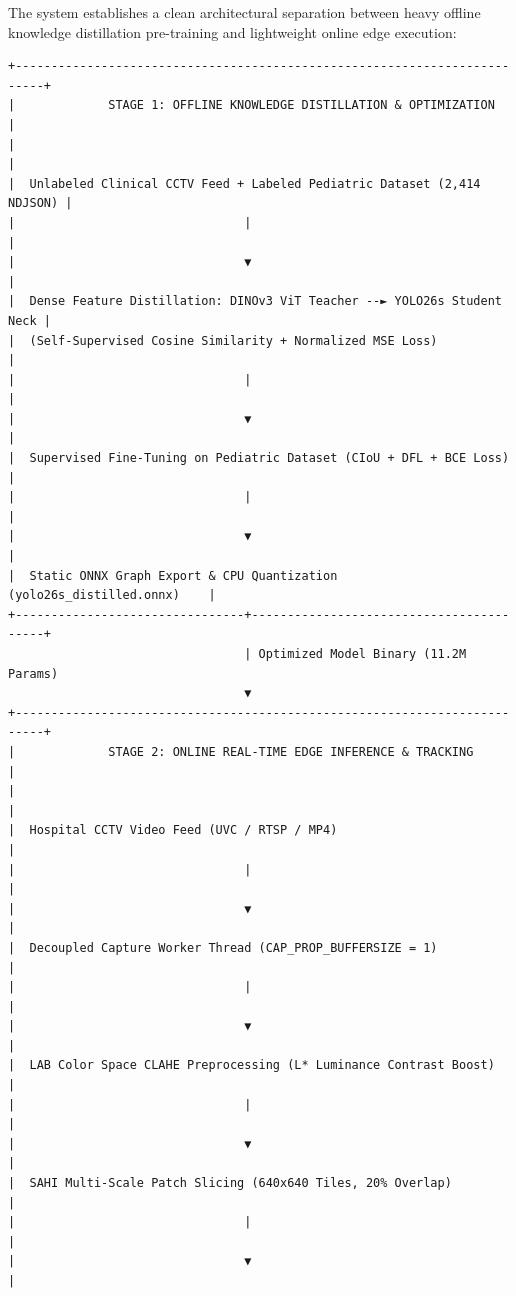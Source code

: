 The system establishes a clean architectural separation between heavy
offline knowledge distillation pre-training and lightweight online edge
execution:

\begin{verbatim}
+--------------------------------------------------------------------------+
|             STAGE 1: OFFLINE KNOWLEDGE DISTILLATION & OPTIMIZATION       |
|                                                                          |
|  Unlabeled Clinical CCTV Feed + Labeled Pediatric Dataset (2,414 NDJSON) |
|                                |                                         |
|                                ▼                                         |
|  Dense Feature Distillation: DINOv3 ViT Teacher --► YOLO26s Student Neck |
|  (Self-Supervised Cosine Similarity + Normalized MSE Loss)               |
|                                |                                         |
|                                ▼                                         |
|  Supervised Fine-Tuning on Pediatric Dataset (CIoU + DFL + BCE Loss)     |
|                                |                                         |
|                                ▼                                         |
|  Static ONNX Graph Export & CPU Quantization (yolo26s_distilled.onnx)    |
+--------------------------------+-----------------------------------------+
                                 | Optimized Model Binary (11.2M Params)
                                 ▼
+--------------------------------------------------------------------------+
|             STAGE 2: ONLINE REAL-TIME EDGE INFERENCE & TRACKING          |
|                                                                          |
|  Hospital CCTV Video Feed (UVC / RTSP / MP4)                             |
|                                |                                         |
|                                ▼                                         |
|  Decoupled Capture Worker Thread (CAP_PROP_BUFFERSIZE = 1)               |
|                                |                                         |
|                                ▼                                         |
|  LAB Color Space CLAHE Preprocessing (L* Luminance Contrast Boost)       |
|                                |                                         |
|                                ▼                                         |
|  SAHI Multi-Scale Patch Slicing (640x640 Tiles, 20% Overlap)             |
|                                |                                         |
|                                ▼                                         |

\end{verbatim}
